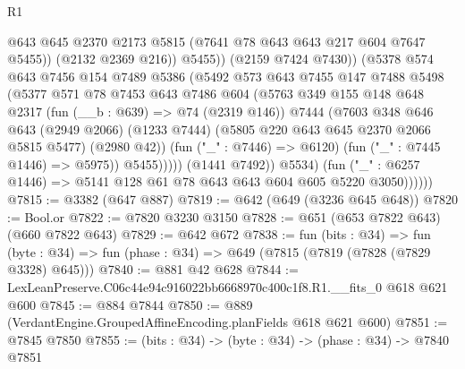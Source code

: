 \begin{lexlean}{R1}
\begin{coremodule}
                                @643
                                @645
                                @2370
                                @2173
                                @5815
                                (@7641 @78 @643 @643 @217 @604 @7647 @5455))
                              (@2132 @2369 @216))
                            @5455))
                        (@2159 @7424 @7430))
                      (@5378
                        @574
                        @643
                        @7456
                        @154
                        @7489
                        @5386
                        (@5492
                          @573
                          @643
                          @7455
                          @147
                          @7488
                          @5498
                          (@5377
                            @571
                            @78
                            @7453
                            @643
                            @7486
                            @604
                            (@5763
                              @349
                              @155
                              @148
                              @648
                              @2317
                              (fun (__b : @639) => @74 (@2319 @146))
                              @7444
                              (@7603
                                @348
                                @646
                                @643
                                (@2949 @2066)
                                (@1233 @7444)
                                (@5805 @220 @643 @645 @2370 @2066 @5815 @5477)
                                (@2980 @42))
                              (fun ("_" : @7446) => @6120)
                              (fun ("_" : @7445 @1446) => @5975))
                            @5455)))))
                  (@1441 @7492))
                @5534)
              (fun ("_" : @6257 @1446) => @5141 @128 @61 @78 @643 @643 @604 @605 @5220 @3050))))))
@7815 := @3382 (@647 @887)
@7819 := @642 (@649 (@3236 @645 @648))
@7820 := Bool.or
@7822 := @7820 @3230 @3150
@7828 := @651 (@653 @7822 @643) (@660 @7822 @643)
@7829 := @642 @672
@7838 := fun (bits : @34) =>
  fun (byte : @34) => fun (phase : @34) => @649 (@7815 (@7819 (@7828 (@7829 @3328) @645)))
@7840 := @881 @42 @628
@7844 := LexLeanPreserve.C06c44e94c916022bb6668970c400c1f8.R1.__fits_0 @618 @621 @600
@7845 := @884 @7844
@7850 := @889 (VerdantEngine.GroupedAffineEncoding.planFields @618 @621 @600)
@7851 := @7845 @7850
@7855 := (bits : @34) -> (byte : @34) -> (phase : @34) -> @7840 @7851

\end{coremodule}
\end{lexlean}
